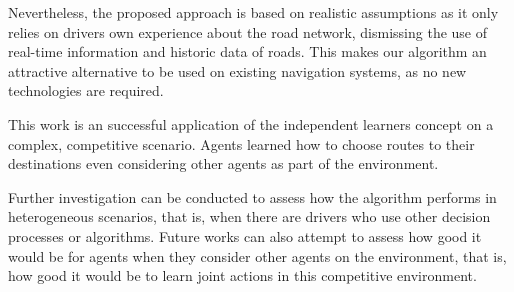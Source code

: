 \documentclass[12pt]{article}
\begin{document}
Nevertheless, the proposed approach is based on realistic assumptions as it only relies on drivers own experience about the road network, dismissing the use of real-time information and historic data of roads. This makes our algorithm an attractive alternative to be used on existing navigation systems, as no new technologies are required.

This work is an successful application of the independent learners concept on a complex, competitive scenario. Agents learned how to choose routes to their destinations even considering other agents as part of the environment.

Further investigation can be conducted to assess how the algorithm performs in heterogeneous scenarios, that is, when there are drivers who use other decision processes or algorithms. Future works can also attempt to assess how good it would be for agents when they consider other agents on the environment, that is, how good it would be to learn joint actions in this competitive environment.


 
\end{document}
